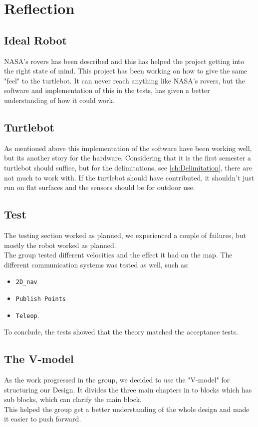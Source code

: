 \chapter{Reflection}

\section{Ideal Robot}

NASA's rovers has been described and this has helped the project getting into the right state of mind. This project has been working on how to give the same "feel" to the turtlebot. It can never reach anything like NASA's rovers, but the software and implementation of this in the tests, has given a better understanding of how it could work.\\

\section{Turtlebot}

As mentioned above this implementation of the software have been working well, but its another story for the hardware. Considering that it is the first semester a turtlebot should suffice, but for the delimitations, see \ref{ch:Delimitation}, there are not much to work with. If the turtlebot should have contributed, it shouldn't just run on flat surfaces and the sensors should be for outdoor use.\\ 

\section{Test}

The testing section worked as planned, we experienced a couple of failures, but mostly the robot worked as planned.\\
The group tested different velocities and the effect it had on the map. The different communication systems was tested as well, such as:\\
\begin{itemize}
    \item \texttt{2D\_nav}
    \item \texttt{Publish Points}
    \item \texttt{Teleop}.
\end{itemize}
To conclude, the tests showed that the theory matched the acceptance tests.\\

\section{The V-model}

As the work progressed in the group, we decided to use the "V-model" for structuring our Design.
It divides the three main chapters in to blocks which has sub blocks, which can clarify the main block.\\ This helped the group get a better understanding of the whole design and made it easier to push forward.\\


